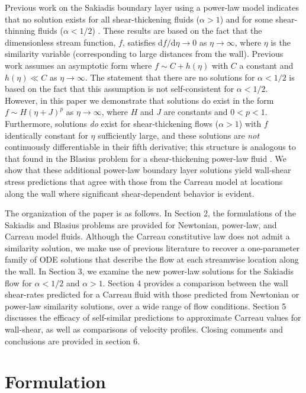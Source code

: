 \documentclass{article}
\begin{document}
Previous work on the Sakiadis boundary layer using a power-law model indicates that no solution exists for all shear-thickening fluids ($\alpha > 1$) and for some shear-thinning fluids ($\alpha < 1/2$) \cite{Fox, NonNewtonian}. These results are based on the fact that the dimensionless stream function, $f$, satisfies $\text{d}f/\text{d}\eta \to 0$ as $\eta \to \infty$, where $\eta$ is the similarity variable (corresponding to large distances from the wall). Previous work assumes an asymptotic form where $f \sim C + h(\eta)$ with $C$ a constant and $h(\eta) \ll C$ as $\eta \to \infty$. The statement that there are no solutions for $\alpha < 1/2$ is based on the fact that this assumption is not self-consistent for $\alpha < 1/2$.  However, in this paper we demonstrate that solutions do exist in the form $f \sim H(\eta + J)^p$ as $\eta \to \infty$, where $H$ and $J$ are constants and $0<p<1$.  Furthermore, solutions \textit{do} exist for shear-thickening flows ($\alpha > 1$) with $f$ identically constant for $\eta$ sufficiently large, and these solutions are \textit{not} continuously differentiable in their fifth derivative; this structure is analogous to that found in the Blasius problem for a shear-thickening power-law fluid \cite{Zhizhin1978-us, Pavlov1982-qh}. We show that these additional power-law boundary layer solutions yield wall-shear stress predictions that agree with those from the Carreau model at locations along the wall where significant shear-dependent behavior is evident.

The organization of the paper is as follows. In Section 2, the formulations of the Sakiadis and Blasius problems are provided for Newtonian, power-law, and Carreau model fluids. Although the Carreau constitutive law does not admit a similarity solution, we make use of previous literature \cite{Griffiths} to recover a one-parameter family of ODE solutions that describe the flow at each streamwise location along the wall. In Section 3, we examine the new power-law solutions for the Sakiadis flow for $\alpha < 1/2$ and $\alpha > 1$. Section 4 provides a comparison between the wall shear-rates predicted for a Carreau fluid with those predicted from Newtonian or power-law similarity solutions, over a wide range of flow conditions. Section 5 discusses the efficacy of self-similar predictions to approximate Carreau values for wall-shear, as well as comparisons of velocity profiles. Closing comments and conclusions are provided in section 6.

\section{Formulation}
\end{document}
